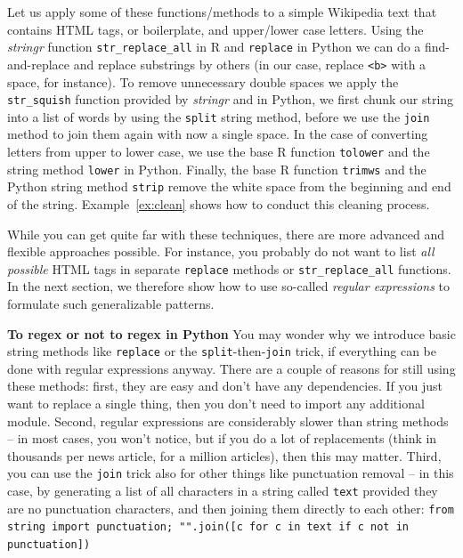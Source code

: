 Let us apply some of these functions/methods to a simple Wikipedia
text that contains HTML tags, or boilerplate, and upper/lower
case letters.
Using the \emph{stringr} function \texttt{str\_replace\_all} in R
and \texttt{replace} in Python we can do a find-and-replace and replace substrings
by others (in our case, replace \verb|<b>| with a space, for instance).
To remove unnecessary double spaces we apply the \texttt{str\_squish} function provided by \emph{stringr} and in Python,
we first chunk our string into a list of words by using the \texttt{split} string method, before we use the \texttt{join} method
to join them again with now a single space.
In the case of converting letters from upper to lower case, we use the base R function \texttt{tolower} and the string
method \texttt{lower} in Python.
Finally, the base R function \texttt{trimws} and the
Python string method \texttt{strip} remove the white space from the beginning
and end of the string.
Example~\ref{ex:clean} shows how to conduct this cleaning process.

While you can get quite far with these techniques, there are more advanced and flexible approaches possible.
For instance, you probably do not want to list \emph{all possible} HTML tags in separate \texttt{replace} methods or \texttt{str\_replace\_all} functions. In the next section, we therefore show how to use so-called \emph{regular expressions} to formulate such generalizable patterns.


\begin{feature}
  \textbf{To regex or not to regex in Python}
  You may wonder why we introduce basic string methods like \texttt{replace} or the \texttt{split}-then-\texttt{join} trick, if everything can be done with regular expressions anyway. There are a couple of reasons for still using these methods: first, they are easy and don't have any dependencies. If you just want to replace a single thing, then you don't need to import any additional module. Second, regular expressions are considerably slower than string methods -- in most cases, you won't notice, but if you do a lot of replacements (think in thousands per news article, for a million  articles), then this may matter. Third, you can use the \texttt{join} trick also for other things like punctuation removal -- in this case, by generating a list of all characters in a string called \verb|text| provided they are no punctuation characters, and then joining them directly to each other:
\verb|from string import punctuation; "".join([c for c in text if c not in punctuation])|
  \end{feature}


